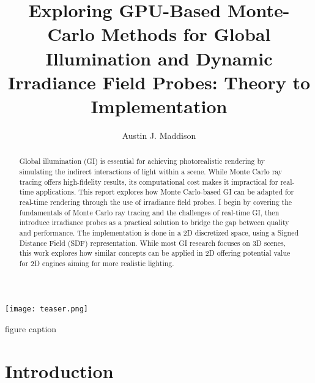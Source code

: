 \documentclass[acmtog, nonacm]{acmart}
\begin{document}
\title{Exploring GPU-Based Monte-Carlo Methods for Global Illumination and Dynamic Irradiance Field Probes: Theory to Implementation}


\author{Austin J. Maddison}


\renewcommand{\shortauthors}{Austin J. Maddison}

  \begin{teaserfigure}
    \texttt{[image: teaser.png]}
    \caption{figure caption}
  \end{teaserfigure}

\begin{abstract}  
Global illumination (GI) is essential for achieving photorealistic rendering by simulating the indirect interactions of light within a scene. While Monte Carlo ray tracing offers high-fidelity results, its computational cost makes it impractical for real-time applications. This report explores how Monte Carlo-based GI can be adapted for real-time rendering through the use of irradiance field probes. I begin by covering the fundamentals of Monte Carlo ray tracing and the challenges of real-time GI, then introduce irradiance probes as a practical solution to bridge the gap between quality and performance. The implementation is done in a 2D discretized space, using a Signed Distance Field (SDF) representation. While most GI research focuses on 3D scenes, this work explores how similar concepts can be applied in 2D offering potential value for 2D engines aiming for more realistic lighting. 
\end{abstract}




\maketitle

\section{Introduction}
\end{document}
